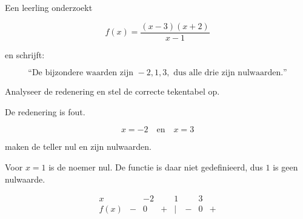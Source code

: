 \documentclass{ximera}
\begin{document}
\begin{oefening}{\oefU\ESS}

Een leerling onderzoekt

\[
f(x)=\frac{(x-3)(x+2)}{x-1}
\]

en schrijft:

\[
\text{``De bijzondere waarden zijn }-2,1,3,
\text{ dus alle drie zijn nulwaarden.''}
\]

Analyseer de redenering en stel de correcte tekentabel op.

\begin{oplossing}
De redenering is fout.

\[
x=-2\quad\text{en}\quad x=3
\]

maken de teller nul en zijn nulwaarden.

Voor \(x=1\) is de noemer nul. De functie is daar niet gedefinieerd,
dus \(1\) is geen nulwaarde.

\[
\begin{array}{c|ccccccc}
x &  & -2 & & 1 &  & 3 & \\
\hline
f(x)&-&0&+&\mid &-&0&+
\end{array}
\]
\end{oplossing}

\end{oefening}
\end{document}
